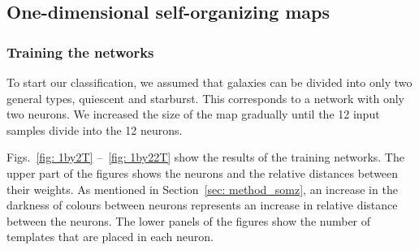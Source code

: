     \subsection{One-dimensional self-organizing maps}
    \label{sec: 1D_somz}
        \subsubsection{Training the networks}
        \label{sec: 1Dt}
            To start our classification, we assumed that galaxies can be divided into only two general types, quiescent and starburst.
            This corresponds to a network with only two neurons.
            We increased the size of the map gradually until the 12 input samples divide into the 12 neurons. 
        
            Figs.~\ref{fig: 1by2T} --~\ref{fig: 1by22T} show the results of the training networks.  
            The upper part of the figures shows the neurons and the relative distances between their weights. 
            As mentioned in Section~\ref{sec: method_somz}, an increase in the darkness of colours between neurons represents an increase in relative distance between the neurons.
            The lower panels of the figures show the number of  templates that are placed in each neuron. 
